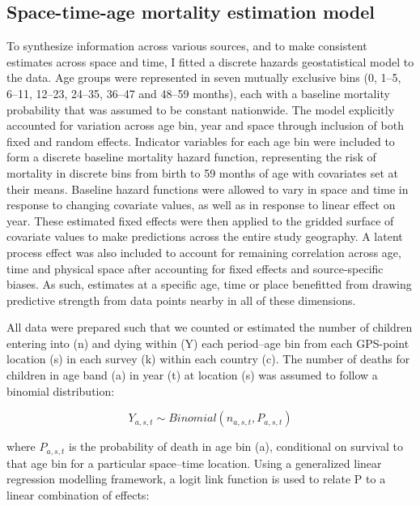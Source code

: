 \documentclass[
]{article}
\begin{document}
\hypertarget{space-time-age-mortality-estimation-model}{%
\subsection{Space-time-age mortality estimation model}\label{space-time-age-mortality-estimation-model}}

To synthesize information across various sources, and to make consistent estimates across space and time, I fitted a discrete hazards geostatistical model to the data. Age groups were represented in seven mutually exclusive bins (0, 1--5, 6--11, 12--23, 24--35, 36--47 and 48--59 months), each with a baseline mortality probability that was assumed to be constant nationwide. The model explicitly accounted for variation across age bin, year and space through inclusion of both fixed and random effects. Indicator variables for each age bin were included to form a discrete baseline mortality hazard function, representing the risk of mortality in discrete bins from birth to 59 months of age with covariates set at their means. Baseline hazard functions were allowed to vary in space and time in response to changing covariate values, as well as in response to linear effect on year. These estimated fixed effects were then applied to the gridded surface of covariate values to make predictions across the entire study geography. A latent process effect was also included to account for remaining correlation across age, time and physical space after accounting for fixed effects and source-specific biases. As such, estimates at a specific age, time or place benefitted from drawing predictive strength from data points nearby in all of these dimensions.

All data were prepared such that we counted or estimated the number of children entering into (n) and dying within (Y) each period--age bin from each GPS-point location (s) in each survey (k) within each country (c). The number of deaths for children in age band (a) in year (t) at location (s) was assumed to follow a binomial distribution:

\[Y_{a,s,t} \sim Binomial(n_{a,s,t}, P_{a,s,t})\]

where \(P_{a,s,t}\) is the probability of death in age bin (a), conditional on survival to that age bin for a particular space--time location. Using a generalized linear regression modelling framework, a logit link function is used to relate P to a linear combination of effects:
\end{document}

